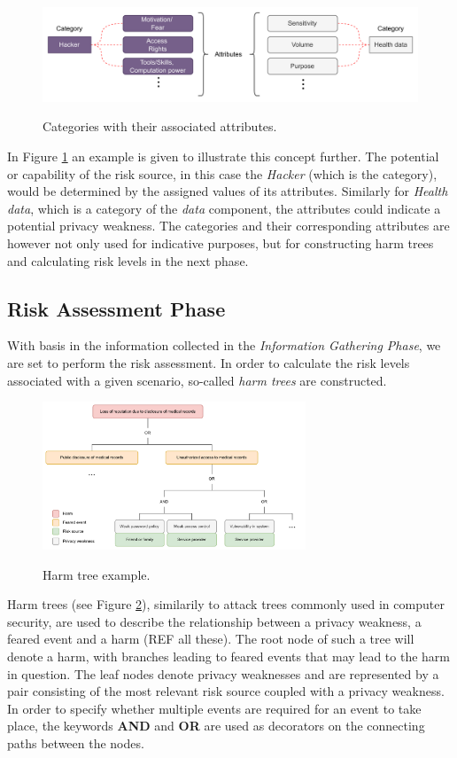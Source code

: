 \begin{figure}[hbt!]
  \centering
  \includegraphics[width=\textwidth]{pictures/cat_att.png}
  \caption{}{Categories with their associated attributes.}
  \label{fig:cat_att}
\end{figure}

In Figure \ref{fig:cat_att} an example is given to illustrate this concept
further. The potential or capability of the risk source, in this case the
\textit{Hacker} (which is the category), would be determined by the assigned
values of its attributes. Similarly for \textit{Health data}, which is a
category of the \textit{data} component, the attributes could indicate a
potential privacy weakness. The categories and their corresponding attributes
are however not only used for indicative purposes, but for constructing harm
trees and calculating risk levels in the next phase.

\subsection{Risk Assessment Phase}
With basis in the information collected in the \textit{Information Gathering
Phase}, we are set to perform the risk assessment. In order to calculate the
risk levels associated with a given scenario, so-called \textit{harm trees} are
constructed.

\begin{figure}[hbt!]
  \centering
  \includegraphics[width=0.7\textwidth]{pictures/harm_tree_ex.png}
  \caption{}{Harm tree example.}
  \label{fig:harm_tree_ex}
\end{figure}

Harm trees (see Figure \ref{fig:harm_tree_ex}), similarily to attack trees
commonly used in computer security\cite{de2016priam}, are used to describe the
relationship between a privacy weakness, a feared event and a harm (REF all
these). The root node of such a tree will denote a harm, with branches leading
to feared events that may lead to the harm in question. The leaf nodes denote
privacy weaknesses and are represented by a pair consisting of the most relevant
risk source coupled with a privacy weakness. In order to specify whether
multiple events are required for an event to take place, the keywords
\textbf{AND} and \textbf{OR} are used as decorators on the connecting paths
between the nodes.

